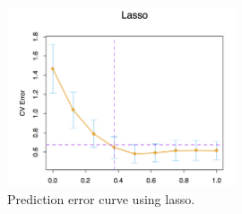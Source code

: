 \documentclass[a4paper]{article}
\begin{document}
\begin{figure}[H]
\centering
\includegraphics[width=0.6\textwidth]{lasso2.png}
\caption{Prediction error curve using lasso.}
\end{figure}
\end{document}
